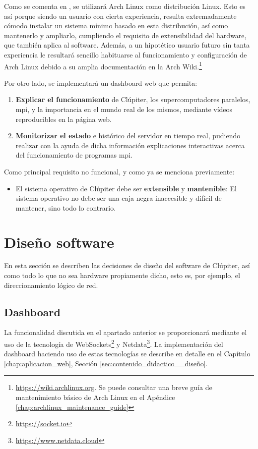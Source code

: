 Como se comenta en , se utilizará Arch Linux como distribución Linux. Esto es así porque siendo un usuario con cierta experiencia, resulta extremadamente cómodo instalar un sistema mínimo basado en esta distribución, así como mantenerlo y ampliarlo, cumpliendo el requisito de extensibilidad del hardware, que también aplica al software. Además, a un hipotético usuario futuro sin tanta experiencia le resultará sencillo habituarse al funcionamiento y configuración de Arch Linux debido a su amplia documentación en la Arch Wiki.\footnote{\url{https://wiki.archlinux.org}. Se puede consultar una breve guía de mantenimiento básico de Arch Linux en el Apéndice \ref{chap:archlinux_maintenance_guide}}

Por otro lado, se implementará un dashboard web que permita:
\begin{enumerate}
    \item \textbf{Explicar el funcionamiento} de Clúpiter, los supercomputadores paralelos, \acrshort{mpi}, y la importancia en el mundo real de los mismos, mediante vídeos reproducibles en la página web.
    \item \textbf{Monitorizar el estado} e histórico del servidor en tiempo real, pudiendo realizar con la ayuda de dicha información explicaciones interactivas acerca del funcionamiento de programas \acrshort{mpi}.
\end{enumerate}

Como principal requisito no funcional, y como ya se menciona previamente:
\begin{itemize}
    \item El sistema operativo de Clúpiter debe ser \textbf{extensible} y \textbf{mantenible}: El sistema operativo no debe ser una caja negra inaccesible y difícil de mantener, sino todo lo contrario.
\end{itemize}

\section{Diseño software}
En esta sección se describen las decisiones de diseño del software de Clúpiter, así como todo lo que no sea hardware propiamente dicho, esto es, por ejemplo, el direccionamiento lógico de red.

\subsection{Dashboard}
La funcionalidad discutida en el apartado anterior se proporcionará mediante el uso de la tecnología de WebSockets\footnote{\url{https://socket.io}} y Netdata\footnote{\url{https://www.netdata.cloud}}. La implementación del dashboard haciendo uso de estas tecnologías se describe en detalle en el Capítulo \ref{chap:aplicacion_web}, Sección \ref{sec:contenido_didactico__diseño}.

